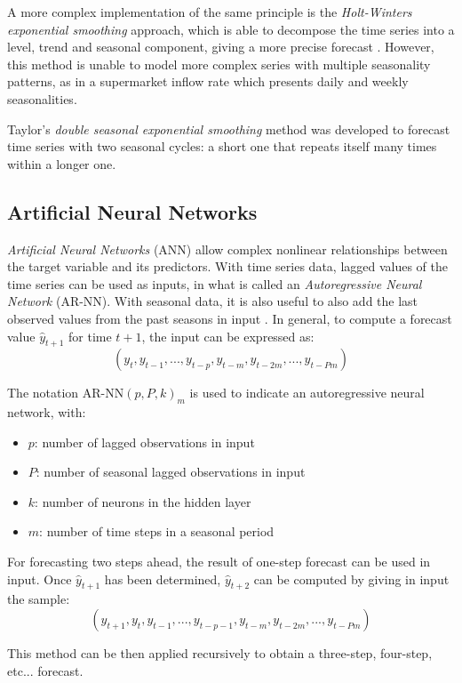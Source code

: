 A more complex implementation of the same principle is the \emph{Holt-Winters exponential smoothing} approach, which is able to decompose the time series into a level, trend and seasonal component, giving a more precise forecast \cite{holt,winters}. However, this method is unable to model more complex series with multiple seasonality patterns, as in a supermarket inflow rate which presents daily and weekly seasonalities.

Taylor’s \emph{double seasonal exponential smoothing} method \cite{taylor} was developed to forecast time series with two seasonal cycles: a short one that repeats itself many times within a longer one.

\subsection{Artificial Neural Networks}
\label{subsec:artificial_neural_networks}

\emph{Artificial Neural Networks} (ANN) allow complex nonlinear relationships between the target variable and its predictors. With time series data, lagged values of the time series can be used as inputs, in what is called an \emph{Autoregressive Neural Network} (AR-NN). With seasonal data, it is also useful to also add the last observed values from the past seasons in input \cite{hyndman2018}. In general, to compute a forecast value \( \hat{y}_{t+1} \) for time \( t+1 \), the input can be expressed as:
\[ (y_{t}, y_{t-1}, ..., y_{t-p}, y_{t-m}, y_{t-2m}, ..., y_{t-Pm}) \]

The notation \( \text{AR-NN}(p, P, k)_m \) is used to indicate an autoregressive neural network, with:
\begin{itemize}
  \item \( p \): number of lagged observations in input
  \item \( P \): number of seasonal lagged observations in input
  \item \( k \): number of neurons in the hidden layer
  \item \( m \): number of time steps in a seasonal period
\end{itemize}

For forecasting two steps ahead, the result of one-step forecast can be used in input. Once \( \hat{y}_{t+1} \) has been determined, \( \hat{y}_{t+2} \) can be computed by giving in input the sample:
\[ (\hat{y}_{t+1}, y_{t}, y_{t-1}, ..., y_{t-p-1}, y_{t-m}, y_{t-2m}, ..., y_{t-Pm}) \]

This method can be then applied recursively to obtain a three-step, four-step, etc... forecast.

